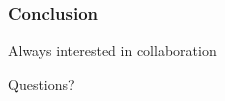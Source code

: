 \documentclass[12pt]{beamer}
\begin{document}
\begin{frame}[fragile]
\frametitle{Conclusion}


\begin{center}
\large
\vspace{-8ex}
Always interested in collaboration

\vspace{8ex}
Questions?
\end{center}
\end{frame}

\end{document}
